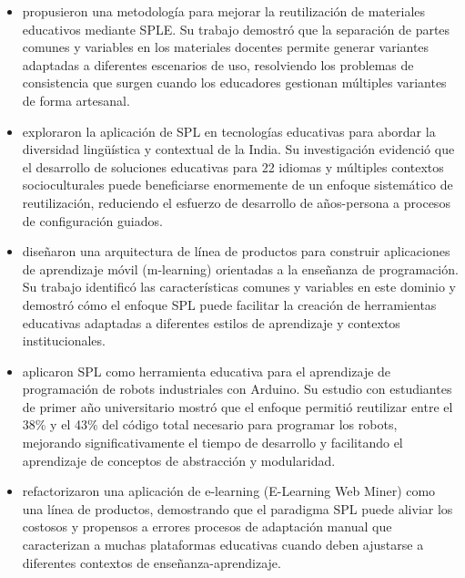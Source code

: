 \begin{itemize}
    \item \citet{okada2009methodology} propusieron una metodología para mejorar la reutilización de materiales educativos mediante \ac{SPLE}. Su trabajo demostró que la separación de partes comunes y variables en los materiales docentes permite generar variantes adaptadas a diferentes escenarios de uso, resolviendo los problemas de consistencia que surgen cuando los educadores gestionan múltiples variantes de forma artesanal.
    
    \item \citet{chimalakonda2012accelerating} exploraron la aplicación de \ac{SPL} en tecnologías educativas para abordar la diversidad lingüística y contextual de la India. Su investigación evidenció que el desarrollo de soluciones educativas para 22 idiomas y múltiples contextos socioculturales puede beneficiarse enormemente de un enfoque sistemático de reutilización, reduciendo el esfuerzo de desarrollo de años-persona a procesos de configuración guiados.
    
    \item \citet{silva2017towards} diseñaron una arquitectura de línea de productos para construir aplicaciones de aprendizaje móvil (m-learning) orientadas a la enseñanza de programación. Su trabajo identificó las características comunes y variables en este dominio y demostró cómo el enfoque \ac{SPL} puede facilitar la creación de herramientas educativas adaptadas a diferentes estilos de aprendizaje y contextos institucionales.
    
    \item \citet{solispino2022software} aplicaron \ac{SPL} como herramienta educativa para el aprendizaje de programación de robots industriales con Arduino. Su estudio con estudiantes de primer año universitario mostró que el enfoque permitió reutilizar entre el 38\% y el 43\% del código total necesario para programar los robots, mejorando significativamente el tiempo de desarrollo y facilitando el aprendizaje de conceptos de abstracción y modularidad.
    
    \item \citet{galan2014building} refactorizaron una aplicación de e-learning (E-Learning Web Miner) como una línea de productos, demostrando que el paradigma \ac{SPL} puede aliviar los costosos y propensos a errores procesos de adaptación manual que caracterizan a muchas plataformas educativas cuando deben ajustarse a diferentes contextos de enseñanza-aprendizaje.
\end{itemize}



